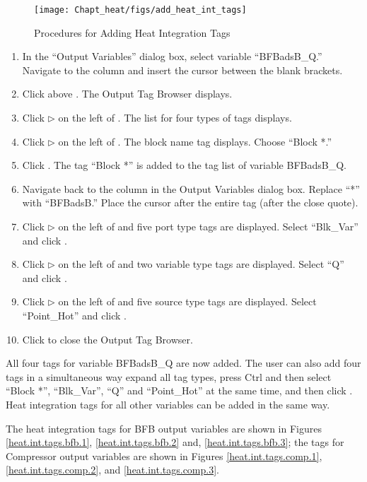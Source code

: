 \begin{figure}[H]
	\begin{center}
		\texttt{[image: Chapt\_heat/figs/add\_heat\_int\_tags]}
		\caption{Procedures for Adding Heat Integration Tags}
		\label{add.heat.int.tags}
	\end{center}
\end{figure}
\clearpage
\begin{enumerate}
	\item In the ``Output Variables'' dialog box, select variable ``BFBadsB\_Q.'' Navigate to the  column and insert the cursor between the blank brackets.
	\item Click  above . The Output Tag Browser displays.
	\item Click $\triangleright$ on the left of . The list for four types of tags displays.
	\item Click $\triangleright$ on the left of . The block name tag displays. Choose ``Block *.''
	\item Click . The tag ``Block *'' is added to the tag list of variable BFBadsB\_Q.
	\item Navigate back to the  column in the Output Variables dialog box. Replace ``*'' with ``BFBadsB.'' Place the cursor after the entire tag (after the close quote).
	\item Click $\triangleright$ on the left of  and five port type tags are displayed. Select ``Blk\_Var'' and click .
	\item Click $\triangleright$ on the left of  and two variable type tags are displayed. Select ``Q'' and click .
	\item Click $\triangleright$ on the left of  and five source type tags are displayed. Select ``Point\_Hot'' and click .
	\item Click  to close the Output Tag Browser.
\end{enumerate}

All four tags for variable BFBadsB\_Q are now added. The user can also add four tags in a simultaneous way expand all tag types, press Ctrl and then select ``Block *'', ``Blk\_Var'', ``Q'' and ``Point\_Hot'' at the same time, and then click . Heat integration tags for all other variables can be added in the same way.

The heat integration tags for BFB output variables are shown in Figures \ref{heat.int.tags.bfb.1}, \ref{heat.int.tags.bfb.2} and, \ref{heat.int.tags.bfb.3}; the tags for Compressor output variables are shown in Figures \ref{heat.int.tags.comp.1}, \ref{heat.int.tags.comp.2}, and \ref{heat.int.tags.comp.3}.


